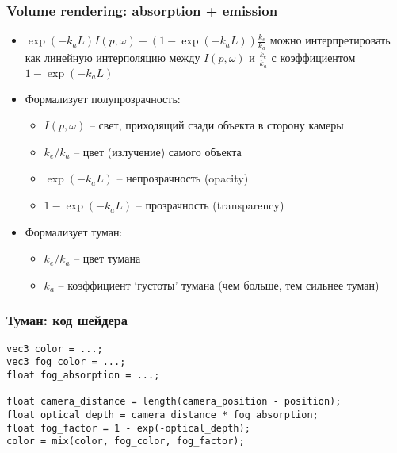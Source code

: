 \documentclass{beamer}
\begin{document}
\begin{frame}[fragile]
\frametitle{Volume rendering: absorption + emission}
\begin{itemize}
\item \begin{math}\exp(-k_a L)I(p,\omega) + (1 - \exp(-k_a L))\frac{k_e}{k_a}\end{math} можно интерпретировать как линейную интерполяцию между \begin{math}I(p,\omega)\end{math} и \begin{math}\frac{k_e}{k_a}\end{math} с коэффициентом \begin{math}1 - \exp(-k_a L)\end{math}
\pause
\item Формализует полупрозрачность:
\begin{itemize}
\item \begin{math}I(p,\omega)\end{math} -- свет, приходящий сзади объекта в сторону камеры
\item \begin{math}k_e / k_a\end{math} -- цвет (излучение) самого объекта
\item \begin{math}\exp(-k_a L)\end{math} -- непрозрачность (opacity)
\item \begin{math}1 - \exp(-k_a L)\end{math} -- прозрачность (transparency)
\end{itemize}
\pause
\item Формализует туман:
\begin{itemize}
\item \begin{math}k_e / k_a\end{math} -- цвет тумана
\item \begin{math}k_a\end{math} -- коэффициент `густоты' тумана (чем больше, тем сильнее туман)
\end{itemize}
\end{itemize}
\end{frame}

\begin{frame}[fragile]
\frametitle{Туман: код шейдера}
\begin{verbatim}
vec3 color = ...;
vec3 fog_color = ...;
float fog_absorption = ...;

float camera_distance = length(camera_position - position);
float optical_depth = camera_distance * fog_absorption;
float fog_factor = 1 - exp(-optical_depth);
color = mix(color, fog_color, fog_factor);
\end{verbatim}
\end{frame}
\end{document}
